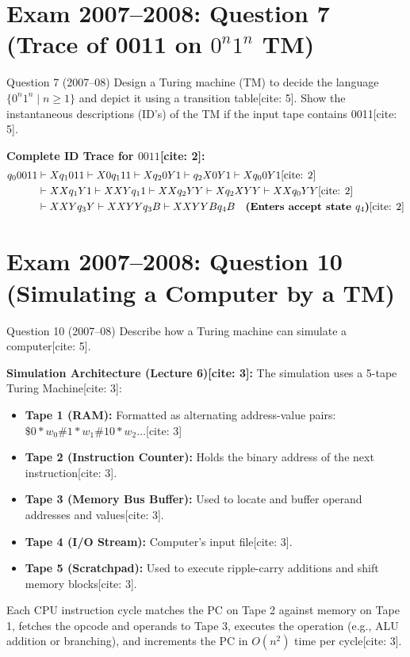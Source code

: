 \documentclass[11pt,a4paper]{article}
\begin{document}
\section{Exam 2007--2008: Question 7 (Trace of 0011 on $0^n 1^n$ TM)}
\begin{questionbox}{Question 7 (2007--08)}
Design a Turing machine (TM) to decide the language $\{0^n 1^n \mid n \ge 1\}$ and depict it using a transition table[cite: 5]. Show the instantaneous descriptions (ID's) of the TM if the input tape contains 0011[cite: 5].
\end{questionbox}

\begin{solutionbox}
\textbf{Complete ID Trace for $0011$[cite: 2]:}
\begin{align*}
q_0 0011 &\vdash X q_1 011 \vdash X0 q_1 11 \vdash X q_2 0Y1 \vdash q_2 X0Y1 \vdash X q_0 0Y1 \text{[cite: 2]} \\
&\vdash XX q_1 Y1 \vdash XXY q_1 1 \vdash XX q_2 YY \vdash X q_2 XYY \vdash XX q_0 YY \text{[cite: 2]} \\
&\vdash XXY q_3 Y \vdash XXYY q_3 B \vdash XXYYB q_4 B \quad \text{\textbf{(Enters accept state $q_4$)}} \text{[cite: 2]}
\end{align*}
\end{solutionbox}

\section{Exam 2007--2008: Question 10 (Simulating a Computer by a TM)}
\begin{questionbox}{Question 10 (2007--08)}
Describe how a Turing machine can simulate a computer[cite: 5].
\end{questionbox}

\begin{solutionbox}
\textbf{Simulation Architecture (Lecture 6)[cite: 3]:}
The simulation uses a 5-tape Turing Machine[cite: 3]:
\begin{itemize}[leftmargin=*]
    \item \textbf{Tape 1 (RAM):} Formatted as alternating address-value pairs: $\$ 0*w_0 \# 1*w_1 \# 10*w_2 \dots$[cite: 3]
    \item \textbf{Tape 2 (Instruction Counter):} Holds the binary address of the next instruction[cite: 3].
    \item \textbf{Tape 3 (Memory Bus Buffer):} Used to locate and buffer operand addresses and values[cite: 3].
    \item \textbf{Tape 4 (I/O Stream):} Computer's input file[cite: 3].
    \item \textbf{Tape 5 (Scratchpad):} Used to execute ripple-carry additions and shift memory blocks[cite: 3].
\end{itemize}
Each CPU instruction cycle matches the PC on Tape 2 against memory on Tape 1, fetches the opcode and operands to Tape 3, executes the operation (e.g., ALU addition or branching), and increments the PC in $O(n^2)$ time per cycle[cite: 3].
\end{solutionbox}
\end{document}
